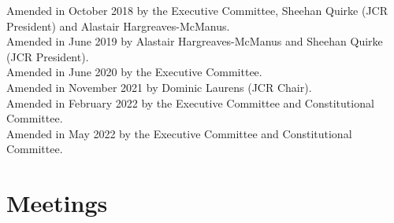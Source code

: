 \documentclass[12pt]{article}
\begin{document}
Amended in October 2018 by the Executive Committee, Sheehan Quirke (JCR President) and Alastair Hargreaves-McManus.\\
Amended in June 2019 by Alastair Hargreaves-McManus and Sheehan Quirke (JCR President).\\
Amended in June 2020 by the Executive Committee.\\
Amended in November 2021 by Dominic Laurens (JCR Chair).\\
Amended in February 2022 by the Executive Committee and Constitutional Committee.\\
Amended in May 2022 by the Executive Committee and Constitutional Committee.

\newpage
\tableofcontents{}
\newpage


\section{Meetings}
\end{document}
